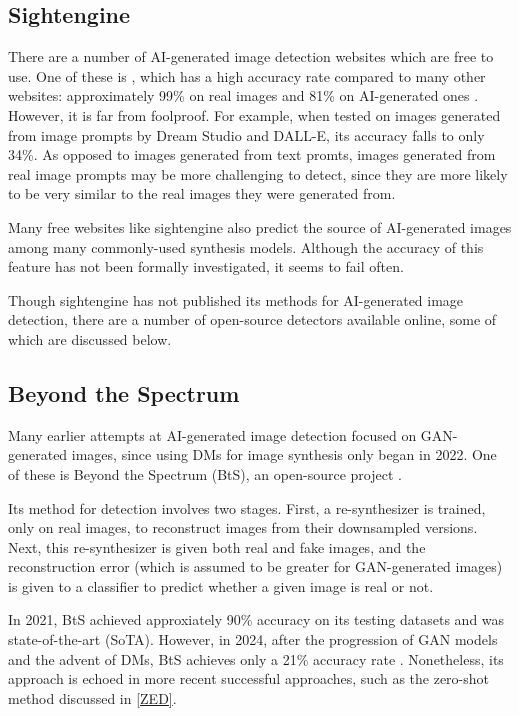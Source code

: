 \documentclass{article} %
\begin{document}
\subsection{Sightengine}

There are a number of AI-generated image detection websites which are free to use. One of these is \citet{sightengine}, which has a high accuracy rate compared to many other websites: approximately 99\% on real images and 81\% on AI-generated ones \citep{li2024adversarialaiartunderstandinggeneration}. However, it is far from foolproof. For example, when tested on images generated from image prompts by Dream Studio and DALL-E, its accuracy falls to only 34\%. As opposed to images generated from text promts, images generated from real image prompts may be more challenging to detect, since they are more likely to be very similar to the real images they were generated from.

Many free websites like sightengine also predict the source of AI-generated images among many commonly-used synthesis models. Although the accuracy of this feature has not been formally investigated, it seems to fail often.

Though sightengine has not published its methods for AI-generated image detection, there are a number of open-source detectors available online, some of which are discussed below.

\subsection{Beyond the Spectrum}

Many earlier attempts at AI-generated image detection focused on GAN-generated images, since using DMs for image synthesis only began in 2022. One of these is Beyond the Spectrum (BtS), an open-source project \citep{he2021spectrumdetectingdeepfakesresynthesis}.

Its method for detection involves two stages. First, a re-synthesizer is trained, only on real images, to reconstruct images from their downsampled versions. Next, this re-synthesizer is given both real and fake images, and the reconstruction error (which is assumed to be greater for GAN-generated images) is given to a classifier to predict whether a given image is real or not.

In 2021, BtS achieved approxiately 90\% accuracy on its testing datasets and was state-of-the-art (SoTA). However, in 2024, after the progression of GAN models and the advent of DMs, BtS achieves only a 21\% accuracy rate \citep{li2024adversarialaiartunderstandinggeneration}. Nonetheless, its approach is echoed in more recent successful approaches, such as the zero-shot method discussed in \ref{ZED}.
\end{document}
